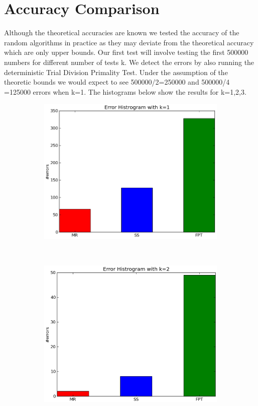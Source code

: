\documentclass[compressed,final,notitlepage,narroweqnarray,inline,twoside,]{ieee}
\begin{document}
\section{Accuracy Comparison}
Although the theoretical accuracies are known we tested the accuracy of the random algorithms in practice as they may deviate from the theoretical accuracy which are only upper bounds. Our first test will involve testing the first 500000 numbers for different number of tests k. We detect the errors by also running the deterministic Trial Division Primality Test. Under the assumption of the theoretic bounds we would expect to see 500000/2=250000 and 500000/4 =125000 errors when k=1. The histograms below show the results for k=1,2,3.
\begin{figure}[H]
        \centering
        \begin{subfigure}[b]{0.23\textwidth}
                \includegraphics[width=\textwidth]{../images/Accuracy_k1}
                \label{fig:gull}
        \end{subfigure}%
        ~ 
        \begin{subfigure}[b]{0.23\textwidth}
                \includegraphics[width=\textwidth]{../images/Accuracy_k2}

\end{subfigure}
\end{figure}
\end{document}
